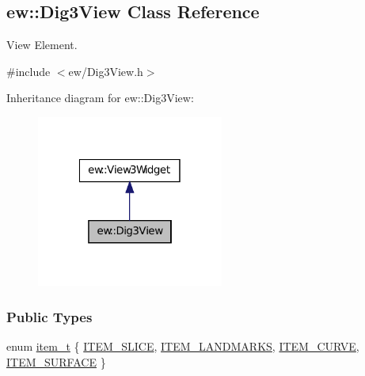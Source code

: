 \hypertarget{classew_1_1Dig3View}{
\subsection{ew::Dig3View Class Reference}
\label{classew_1_1Dig3View}
}


View Element.  




{\ttfamily \#include $<$ew/Dig3View.h$>$}



Inheritance diagram for ew::Dig3View:
\nopagebreak
\begin{figure}[H]
\begin{center}
\leavevmode
\includegraphics[width=174pt]{classew_1_1Dig3View__inherit__graph}
\end{center}
\end{figure}
\subsubsection*{Public Types}
\begin{DoxyCompactItemize}
\item 
enum \hyperlink{classew_1_1Dig3View_ac4e4e4036d49a73a3470f7c46057e13a}{item\_\-t} \{ \hyperlink{classew_1_1Dig3View_ac4e4e4036d49a73a3470f7c46057e13aa12554f487cbf4981a9cf8cf72a668bc7}{ITEM\_\-SLICE}, 
\hyperlink{classew_1_1Dig3View_ac4e4e4036d49a73a3470f7c46057e13aa19b28108a6c147a4f67a7ca301a4b9f4}{ITEM\_\-LANDMARKS}, 
\hyperlink{classew_1_1Dig3View_ac4e4e4036d49a73a3470f7c46057e13aa1921cd87bd7301098b2b318936a61beb}{ITEM\_\-CURVE}, 
\hyperlink{classew_1_1Dig3View_ac4e4e4036d49a73a3470f7c46057e13aaae05252997168fd1f936c7d04cfc57e5}{ITEM\_\-SURFACE}
 \}
\end{DoxyCompactItemize}
